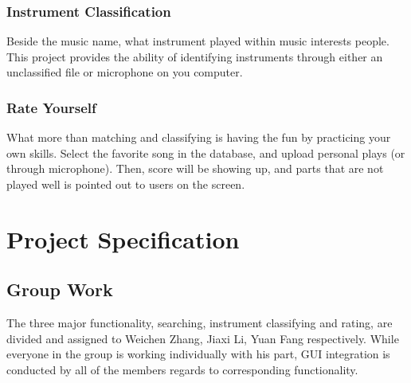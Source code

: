 \documentclass[whitelogo,12pt]{tudelft-report}
\begin{document}
\subsection{Instrument Classification}
Beside the music name, what instrument played within music interests people. This project provides the ability of identifying instruments through either an unclassified file or microphone on you computer.

\subsection{Rate Yourself}
What more than matching and classifying is having the fun by practicing your own skills. Select the favorite  song in the database, and upload personal plays (or through microphone). Then, score will be showing up, and parts that are not played well is pointed out to users on the screen.

\chapter{Project Specification}
\section{Group Work}
The three major functionality, searching, instrument classifying and rating, are divided and assigned to Weichen Zhang, Jiaxi Li, Yuan Fang respectively. While everyone in the group is working individually with his part, GUI integration is conducted by all of the members regards to corresponding functionality.
\end{document}
